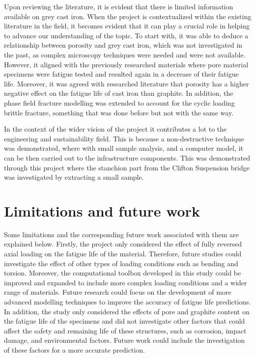 \documentclass[11pt,a4paper]{article}
\begin{document}
\noindent Upon reviewing the literature, it is evident that there is limited information available on grey cast iron. When the project is contextualized within the existing literature in the field, it becomes evident that it can play a crucial role in helping to advance our understanding of the topic. To start with, it was able to deduce a relationship between porosity and grey cast iron, which was not investigated in the past, as complex microscopy techniques were needed and were not available. However, it aligned with the previously researched materials where pore material specimens were fatigue tested and resulted again in a decrease of their fatigue life. Moreover, it was agreed with researched literature that porosity has a higher negative effect on the fatigue life of cast iron than graphite. In addition, the phase field fracture modelling was extended to account for the  cyclic loading brittle fracture, something that was done before but not with the same way.

\noindent In the context of the wider vision of the project it contributes a lot to the engineering and sustainability field. This is because a non-destructive technique was demonstrated, where with small sample analysis, and a computer model, it can be then carried out to the infrastructure components. This was demonstrated through this project where the stanchion part from the Clifton Suspension bridge was investigated by extracting a small sample.

\section{Limitations and future work}
Some limitations and the corresponding future work associated with them are explained below. Firstly, the project only considered the effect of fully reversed axial loading on the fatigue life of the material. Therefore, future studies could investigate the effect of other types of loading conditions such as bending and torsion. Moreover, the computational toolbox developed in this study could be improved and expanded to include more complex loading conditions and a wider range of materials. Future research could focus on the development of more advanced modelling techniques to improve the accuracy of fatigue life predictions. In addition, the study only considered the effects of pore and graphite content on the fatigue life of the specimens and did not investigate other factors that could affect the safety and remaining life of these structures, such as corrosion, impact damage, and environmental factors. Future work could include the investigation of these factors for a more accurate prediction.
\end{document}

